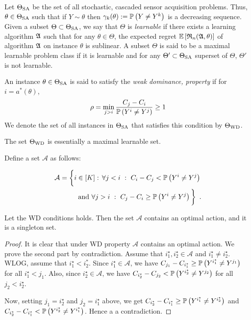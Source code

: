 \vspace{-7pt}
Let $\Theta_{\mathrm{SA}}$ be the set of all stochastic, cascaded sensor acquisition problems. 
Thus, $\theta \in \Theta_{\mathrm{SA}}$ such that if $Y\sim \theta$ then $\gamma_k(\theta):=\mathbb{P}\left(Y\ne Y^k\right)$ 
is a decreasing sequence.
Given a subset $\Theta\subset \Theta_{\mathrm{SA}}$, we say that $\Theta$ is \emph{learnable} 
if there exists a learning algorithm $\mathfrak{A}$ such that
for any $\theta\in \Theta$, the expected regret $\mathbb{E}\left[ \mathfrak{R}_n(\mathfrak{A},\theta) \right]$ 
of algorithm $\mathfrak{A}$ on instance $\theta$ is sublinear.
A subset $\Theta$ is said to be a maximal learnable problem class if it is learnable and for any $\Theta'\subset \Theta_{\mathrm{SA}}$ superset
of $\Theta$, $\Theta'$ is not learnable.

\begin{defi}
	An instance $\theta \in \Theta_{\mathrm{SA}}$  is said to satisfy the \emph{weak dominance,  property} if 
	for $i = a^*(\theta)$,
	\begin{align}
	\label{eq:wd} \rho = \min_{j > i} \frac{C_j - C_i}{\Prob{Y^i\ne Y^j}} \ge 1 %
	\end{align}
We denote the set of all instances in $\Theta_{\mathrm{SA}}$ that satisfies this condition by $\Theta_{\mathrm{WD}}$.	
\end{defi}
\begin{thm}
The set $\Theta_{\mathrm{WD}}$ is essentially a maximal learnable set.
\end{thm}

Define a set $\mathcal{A}$ as follows:

\begin{align*}
\mathcal{A} =\bigg\{ i \in [K]:\, \forall j<i \,\,:\,\, C_i - C_j < \mathbb{P}\left( Y^i \ne Y^j \right)\, \\
\mbox{  and  }\forall j>i \,\,:\,\, C_j - C_i \ge \mathbb{P}\left( Y^i \ne Y^j \right)
\bigg \}\enspace.
\end{align*}

\begin{lem}
Let the WD conditions holds. Then the set $\mathcal{A}$ contains an optimal action, and it is a singleton set.
\end{lem}
\begin{proof}
It is clear that under WD property $\mathcal{A}$ contains an optimal action. We prove the second part by contradiction.  Assume that $i_1^\star, i_2^\star \in \mathcal{A}$ and $i_1^\star \neq i_2^\star$. WLOG, assume that $i_1^\star < i_2^*$. Since $i^\star_1 \in \mathcal{A}$, we have   $C_{j_1} - C_{i^\star_1} \ge \mathbb{P}\left( Y^{i^\star_1} \ne Y^{j_1 }\right)$ for all $i_1^\star < j_1$. Also, since $i^\star_2 \in \mathcal{A}$, we have  $C_{i^\star_2} - C_{j_2 }< \mathbb{P}\left( Y^{i^\star_2} \ne Y^{j_2} \right)$ for all $j_2 < i^\star_2$. 

Now, setting $j_1=i_2^\star$ and $j_2=i_1^\star$ above, we get    $C_{i_2^\star} - C_{i^\star_1} \ge \mathbb{P}\left( Y^{i^\star_1} \ne Y^{i_2^\star}\right)$ and $C_{i^\star_2} - C_{i_1^\star }< \mathbb{P}\left( Y^{i^\star_2} \ne Y^{i_1^\star} \right)$. Hence a a contradiction.
\end{proof}

